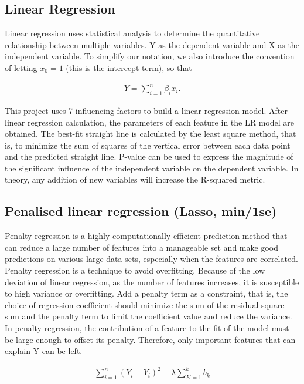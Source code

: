 \subsection{Linear Regression}
Linear regression uses statistical analysis to determine the quantitative relationship between multiple variables. Y as the dependent variable and X as the independent variable. To simplify our notation, we also introduce the convention of letting $x_0 = 1$ (this is the intercept term), so that

\begin{eqnarray}
    Y = \sum_{i=1}^{n}{\beta_i x_i}.
\end{eqnarray}


This project uses 7 influencing factors to build a linear regression model. After linear regression calculation, the parameters of each feature in the LR model are obtained. The best-fit straight line is calculated by the least square method, that is, to minimize the sum of squares of the vertical error between each data point and the predicted straight line. P-value can be used to express the magnitude of the significant influence of the independent variable on the dependent variable. In theory, any addition of new variables will increase the R-squared metric\cite{montgomery2012introduction}.

\subsection{Penalised linear regression (Lasso, min/1se)}
Penalty regression is a highly computationally efficient prediction method that can reduce a large number of features into a manageable set and make good predictions on various large data sets, especially when the features are correlated. Penalty regression is a technique to avoid overfitting. Because of the low deviation of linear regression, as the number of features increases, it is susceptible to high variance or overfitting. Add a penalty term as a constraint, that is, the choice of regression coefficient should minimize the sum of the residual square sum and the penalty term to limit the coefficient value and reduce the variance. In penalty regression, the contribution of a feature to the fit of the model must be large enough to offset its penalty. Therefore, only important features that can explain Y can be left\cite{bowles2015machine}.


\begin{eqnarray}
    \sum_{i=1}^{n}{(Y_i-Y_i)^2} + \lambda  \sum_{K=1}^{k}{b_k}
\end{eqnarray}

